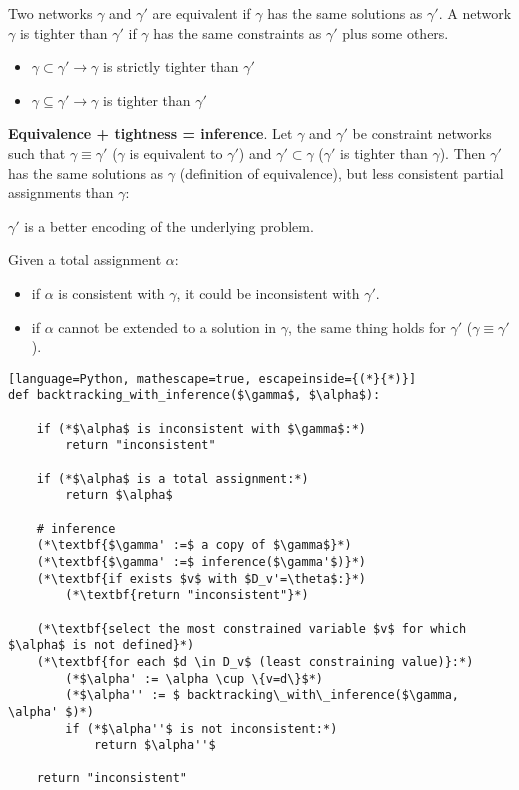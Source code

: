 \documentclass{article}
\begin{document}
Two networks $\gamma$ and $\gamma'$ are equivalent if $\gamma$ has the same solutions as $\gamma'$. A network $\gamma$ is tighter than $\gamma'$ if $\gamma$ has the same constraints as $\gamma'$ plus some others.

\begin{itemize}
    \item $\gamma \subset \gamma' \rightarrow \gamma$ is strictly tighter than $\gamma'$
    \item $\gamma \subseteq \gamma' \rightarrow \gamma$ is tighter than $\gamma'$
\end{itemize}

\textbf{Equivalence + tightness = inference}. Let $\gamma$ and $\gamma'$ be constraint networks such that $\gamma \equiv \gamma'$ ($\gamma$ is equivalent to $\gamma'$) and $\gamma' \subset \gamma$ ($\gamma'$ is tighter than $\gamma$). Then $\gamma'$ has the same solutions as $\gamma$ (definition of equivalence), but less consistent partial assignments than $\gamma$:
\begin{center}
    $\gamma'$ is a better encoding of the underlying problem.
\end{center}

Given a total assignment $\alpha$:
\begin{itemize}
    \item if $\alpha$ is consistent with $\gamma$, it could be inconsistent with $\gamma'$.
    \item if $\alpha$ cannot be extended to a solution in $\gamma$, the same thing holds for $\gamma'$ ($\gamma \equiv \gamma'$).
\end{itemize}

\newpage

\begin{lstlisting}[language=Python, mathescape=true, escapeinside={(*}{*)}]
def backtracking_with_inference($\gamma$, $\alpha$):

    if (*$\alpha$ is inconsistent with $\gamma$:*)
        return "inconsistent"

    if (*$\alpha$ is a total assignment:*)
        return $\alpha$

    # inference
    (*\textbf{$\gamma' :=$ a copy of $\gamma$}*)
    (*\textbf{$\gamma' :=$ inference($\gamma'$)}*)
    (*\textbf{if exists $v$ with $D_v'=\theta$:}*)
        (*\textbf{return "inconsistent"}*)

    (*\textbf{select the most constrained variable $v$ for which $\alpha$ is not defined}*)
    (*\textbf{for each $d \in D_v$ (least constraining value)}:*)
        (*$\alpha' := \alpha \cup \{v=d\}$*)
        (*$\alpha'' := $ backtracking\_with\_inference($\gamma, \alpha' $)*)
        if (*$\alpha''$ is not inconsistent:*)
            return $\alpha''$

    return "inconsistent"
    
\end{lstlisting}
\end{document}
